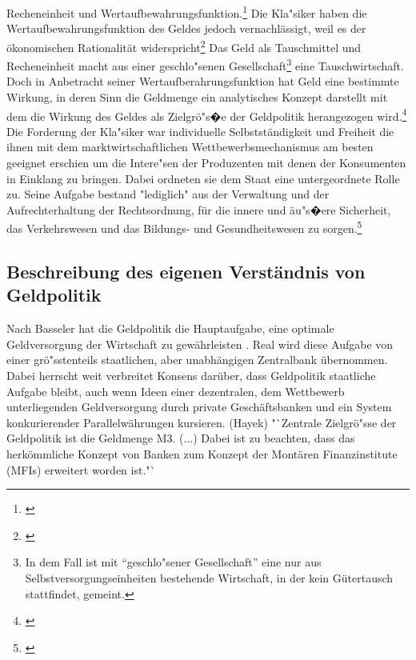 \documentclass[
        onecolumn,
        a4paper,
        abstracton,
        parskip=half
        ,final
        ]{scrartcl}
\begin{document}
Recheneinheit und Wertaufbewahrungsfunktion.\footnote[107]{\citep[S.417]{Basseler2010}} Die Kla{"s}iker haben die Wertaufbewahrungsfunktion des Geldes jedoch vernachl{\"a}ssigt, weil es der {\"o}konomischen Rationalit{\"a}t widerspricht\footnote[108]{\citep[S.53]{bombach1981theorie}} Das Geld als Tauschmittel und Recheneinheit macht aus einer geschlo{"s}enen Gesellschaft\footnote[109]{In dem Fall ist mit "`geschlo{"s}ener Gesellschaft"' eine nur aus Selbstversorgungseinheiten bestehende Wirtschaft, in der kein G{\"u}tertausch stattfindet, gemeint.} eine Tauschwirtschaft. Doch in Anbetracht seiner Wertaufberahrungsfunktion hat Geld eine bestimmte Wirkung, in deren Sinn die Geldmenge ein analytisches Konzept darstellt mit dem die Wirkung des Geldes als Zielgr{\"o}{"s}�e der Geldpolitik herangezogen wird.\footnote[110]{\citep[S.421]{Basseler2010}} Die Forderung der Kla{"s}iker war individuelle Selbstst{\"a}ndigkeit und Freiheit die ihnen mit dem marktwirtschaftlichen Wettbewerbsmechanismus am besten geeignet erschien um die Intere{"s}en der Produzenten mit denen der Konsumenten in Einklang zu bringen. Dabei ordneten sie dem Staat eine untergeordnete Rolle zu. Seine Aufgabe bestand "lediglich" aus der Verwaltung und der Aufrechterhaltung der Rechtsordnung, f{\"u}r die innere und {\"a}u{"s}�ere Sicherheit, das Verkehrswesen und das Bildungs- und Gesundheitswesen zu sorgen.\footnote[111]{\citep[S.60f]{Basseler2010}}














\subsection{Beschreibung des eigenen Verst{\"a}ndnis von Geldpolitik}
    Nach Basseler hat die Geldpolitik die Hauptaufgabe, eine optimale Geldversorgung der Wirtschaft zu gew{\"a}hrleisten \citep[Vgl.][S. 551]{Basseler2010}.
    Real wird diese Aufgabe von einer gr{\"o}{"ss}tenteils staatlichen, aber unabh{\"a}ngigen Zentralbank {\"u}bernommen. Dabei herrscht weit verbreitet Konsens dar{\"u}ber, dass Geldpolitik staatliche Aufgabe bleibt, auch wenn Ideen einer dezentralen, dem Wettbewerb unterliegenden Geldversorgung durch private Gesch{\"a}ftsbanken und ein System konkurierender Parallelw{\"a}hrungen kursieren. (Hayek)
    "`Zentrale Zielgr{\"o}{"ss}e der Geldpolitik ist die Geldmenge M3. (...) Dabei ist zu beachten, dass das herk{\"o}mmliche Konzept von Banken zum Konzept der Mont{\"a}ren Finanzinstitute (MFIs) erweitert worden ist."`
    \citep[vgl.][S. 507]{Basseler2010}
\end{document}
